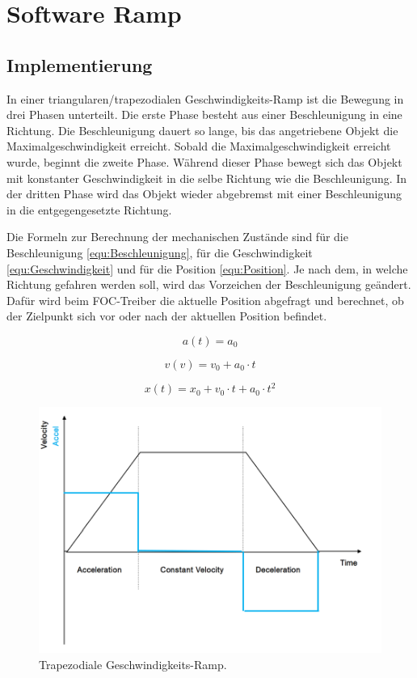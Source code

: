 \section{Software Ramp}

\subsection{Implementierung}\label{Appendix:Software_Ramp_Theorie}

In einer triangularen/trapezodialen Geschwindigkeits-Ramp ist die Bewegung in drei Phasen unterteilt. Die erste Phase besteht aus einer Beschleunigung in eine Richtung. Die Beschleunigung dauert so lange, bis das angetriebene Objekt die Maximalgeschwindigkeit erreicht. Sobald die Maximalgeschwindigkeit erreicht wurde, beginnt die zweite Phase. Während dieser Phase bewegt sich das Objekt mit konstanter Geschwindigkeit in die selbe Richtung wie die Beschleunigung. In der dritten Phase wird das Objekt wieder abgebremst mit einer Beschleunigung in die entgegengesetzte Richtung.

Die Formeln zur Berechnung der mechanischen Zustände sind für die Beschleunigung \ref{equ:Beschleunigung}, für die Geschwindigkeit \ref{equ:Geschwindigkeit} und für die Position \ref{equ:Position}. Je nach dem, in welche Richtung gefahren werden soll, wird das Vorzeichen der Beschleunigung geändert. Dafür wird beim FOC-Treiber die aktuelle Position abgefragt und berechnet, ob der Zielpunkt sich vor oder nach der aktuellen Position befindet.

\begin{equation}
a(t) = a_0
\label{equ:Beschleunigung}
\end{equation}

\begin{equation}
v(v) = v_0 + a_0 \cdot t
\label{equ:Geschwindigkeit}
\end{equation}

\begin{equation}
x(t) = x_0 + v_0 \cdot t + a_0 \cdot t ^ 2
\label{equ:Position}
\end{equation}

\begin{figure}[H]
\center
\includegraphics[width = 0.8 \textwidth]{graphics/Trapezodial_Ramp}
\caption{Trapezodiale Geschwindigkeits-Ramp. \cite{abb_application_2012}}
\label{fig:Trapezodial_Ramp}
\end{figure}

